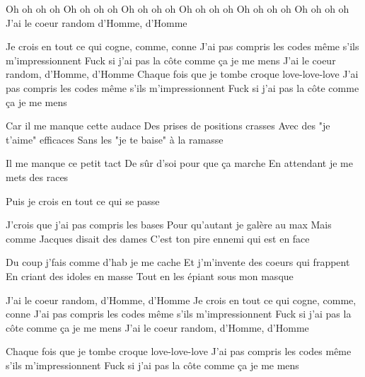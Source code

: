 Oh oh oh oh
Oh oh oh oh
Oh oh oh oh
Oh oh oh oh
Oh oh oh oh
Oh oh oh oh
J'ai le coeur random d'Homme, d'Homme

Je crois en tout ce qui cogne, comme, conne
J'ai pas compris les codes même s'ils m’impressionnent
Fuck si j’ai pas la côte comme ça je me mens
J'ai le coeur random, d'Homme, d'Homme
Chaque fois que je tombe croque love-love-love
J'ai pas compris les codes même s'ils m'impressionnent
Fuck si j'ai pas la côte comme ça je me mens

Car il me manque cette audace
Des prises de positions crasses
Avec des "je t'aime" efficaces
Sans les "je te baise" à la ramasse

Il me manque ce petit tact
De sûr d'soi pour que ça marche
En attendant je me mets des races

Puis je crois en tout ce qui se passe

J'crois que j'ai pas compris les bases
Pour qu'autant je galère au max
Mais comme Jacques disait des dames
C'est ton pire ennemi qui est en face

Du coup j'fais comme d'hab je me cache
Et j'm'invente des coeurs qui frappent
En criant des idoles en masse
Tout en les épiant sous mon masque

J'ai le coeur random, d'Homme, d'Homme
Je crois en tout ce qui cogne, comme, conne
J'ai pas compris les codes même s'ils m’impressionnent
Fuck si j’ai pas la côte comme ça je me mens
J'ai le coeur random, d'Homme, d'Homme

Chaque fois que je tombe croque love-love-love
J'ai pas compris les codes même s'ils m'impressionnent
Fuck si j'ai pas la côte comme ça je me mens